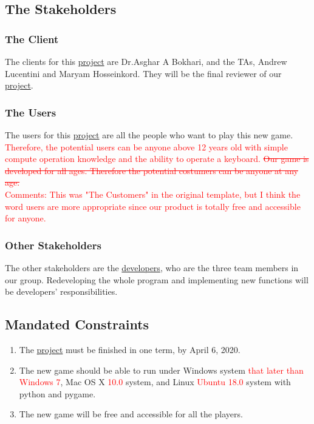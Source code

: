 \documentclass[12pt, titlepage]{article}
\begin{document}
\subsection{The Stakeholders}

\subsubsection{The Client}
The clients for this \underline{project} are Dr.Asghar A Bokhari, and the TAs, Andrew Lucentini and Maryam Hosseinkord. They will be the final reviewer of our \underline{project}.
\subsubsection{The Users} 
The users for this \underline{project} are all the people who want to play this new game. \textcolor{red}{Therefore, the potential users can be anyone above 12 years old with simple compute operation knowledge and the ability to operate a keyboard.} \textcolor{red}{\sout{Our game is developed for all ages. Therefore the potential costumers can be anyone at any age.}}\\

\textcolor{red}{Comments: This was "The Customers" in the original template, but I think the word users are more appropriate since our product is totally free and accessible for anyone.}

\subsubsection{Other Stakeholders}
The other stakeholders are the \underline{developers}, who are the three team members in our group. Redeveloping the whole program and implementing new functions will be developers' responsibilities.
\subsection{Mandated Constraints}
\begin{enumerate}[1.]
	\item The \underline{project} must be finished in one term, by April 6, 2020.
	\item The new game should be able to run under Windows system \textcolor{red}{that later than Windows 7}, Mac OS X \textcolor{red}{10.0} system, and Linux \textcolor{red}{Ubuntu 18.0} system with python and pygame. 
	\item The new game will be free and accessible for all the players.  
	
\end{enumerate}
\end{document}
